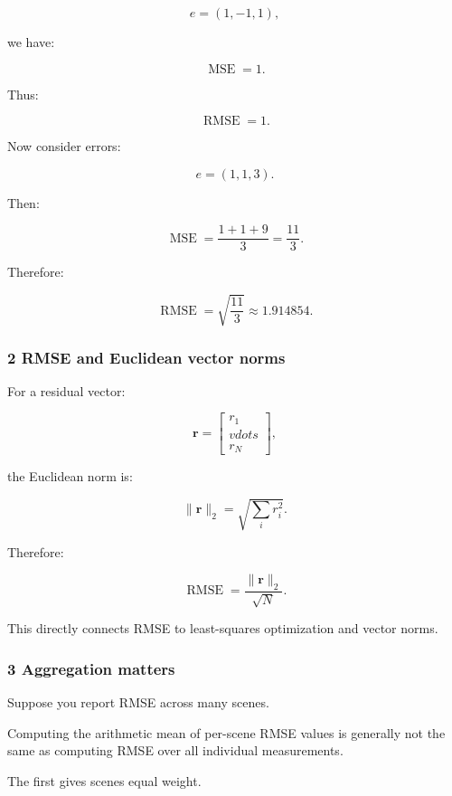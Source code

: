 \[
 e=(1,-1,1),
\]

we have:

\[
 \operatorname{MSE}=1.
\]

Thus:

\[
 \boxed{\operatorname{RMSE}=1}.
\]

Now consider errors:

\[
 e=(1,1,3).
\]

Then:

\[
 \operatorname{MSE} = \frac{1+1+9}{3} =\frac{11}{3}.
\]

Therefore:

\[
 \boxed{ \operatorname{RMSE} = \sqrt{\frac{11}{3}} \approx1.914854 }.
\]

\subsubsection{2 RMSE and Euclidean vector norms}\label{02-foundations-ii-ch030-rmse-and-euclidean-vector-norms}

\hypertarget{02-foundations-ii-ch030-rmse-and-euclidean-vector-norms}{}

For a residual vector:

\[
 \mathbf r= \begin{bmatrix} r_1\\vdots\\r_N \end{bmatrix},
\]

the Euclidean norm is:

\[
 \|\mathbf r\|_2= \sqrt{\sum_i r_i^2}.
\]

Therefore:

\[
 \boxed{ \operatorname{RMSE} = \frac{\|\mathbf r\|_2}{\sqrt N} }.
\]

This directly connects RMSE to least-squares optimization and vector norms.

\subsubsection{3 Aggregation matters}\label{02-foundations-ii-ch030-aggregation-matters}

\hypertarget{02-foundations-ii-ch030-aggregation-matters}{}

Suppose you report RMSE across many scenes.

Computing the arithmetic mean of per-scene RMSE values is generally not the same as computing RMSE over all individual measurements.

The first gives scenes equal weight.

